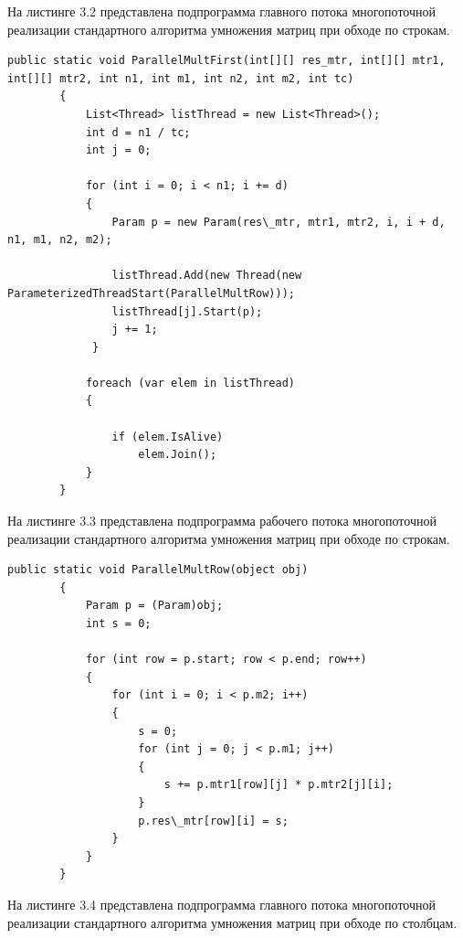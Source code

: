 \documentclass[12pt]{report}
\begin{document}
На листинге 3.2 представлена подпрограмма главного потока многопоточной реализации стандартного алгоритма умножения матриц при обходе по строкам.

\begin{lstlisting}[label=some-code,caption=Подпрограмма главного потока многопоточной реализации стандартного алгоритма умножения матриц (обход по строкам)]
public static void ParallelMultFirst(int[][] res_mtr, int[][] mtr1, int[][] mtr2, int n1, int m1, int n2, int m2, int tc)
        {
            List<Thread> listThread = new List<Thread>();
            int d = n1 / tc;
            int j = 0;
            
            for (int i = 0; i < n1; i += d)
            {
                Param p = new Param(res\_mtr, mtr1, mtr2, i, i + d, n1, m1, n2, m2);
                 
                listThread.Add(new Thread(new ParameterizedThreadStart(ParallelMultRow)));
                listThread[j].Start(p); 
                j += 1;
             }
     
            foreach (var elem in listThread)
            {

                if (elem.IsAlive)
                    elem.Join();
            }
        }
\end{lstlisting}

На листинге 3.3 представлена подпрограмма рабочего потока многопоточной реализации стандартного алгоритма умножения матриц при обходе по строкам.

\begin{lstlisting}[label=some-code,caption=Подпрограмма рабочего потока многопоточной реализации стандартного алгоритма умножения матриц (обход по строкам)]
public static void ParallelMultRow(object obj)
        {
            Param p = (Param)obj;
            int s = 0;

            for (int row = p.start; row < p.end; row++)
            {
                for (int i = 0; i < p.m2; i++)
                {
                    s = 0;
                    for (int j = 0; j < p.m1; j++)
                    {
                        s += p.mtr1[row][j] * p.mtr2[j][i];
                    }
                    p.res\_mtr[row][i] = s;
                }
            }
        }
\end{lstlisting}

На листинге 3.4 представлена подпрограмма главного потока многопоточной реализации стандартного алгоритма умножения матриц при обходе по столбцам.
\end{document}
